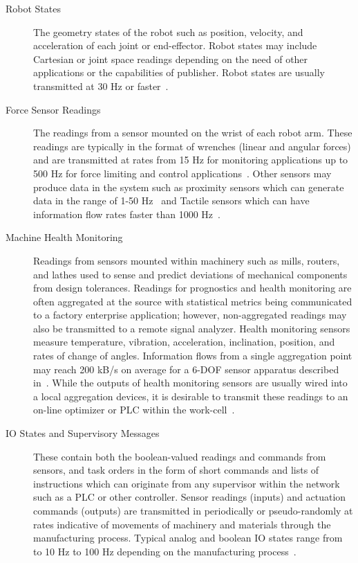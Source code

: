 \documentclass[journal, twoside]{IEEEtran}
\begin{document}
	\begin{description}
		
		\item[Robot States] The geometry states of the robot such as position, velocity, and acceleration of each joint or end-effector. Robot states may include Cartesian or joint space readings depending on the need of other applications or the capabilities of publisher.  Robot states are usually transmitted at 30 Hz or faster~\cite{JMarvel2017}.
		
		\item[Force Sensor Readings] The readings from a sensor mounted on the wrist of each robot arm. These readings are typically in the format of wrenches (linear and angular forces) and are transmitted at rates from 15 Hz for monitoring applications up to 500 Hz for force limiting and control applications~\cite{onrobot}. Other sensors may produce data in the system such as proximity sensors which can generate data in the range of 1-50 Hz~\cite{DiffuseSensorSpecs} and Tactile sensors which can have information flow rates faster than 1000 Hz~\cite{TactileInternet}.
        
        \item[Machine Health Monitoring] Readings from sensors mounted within machinery such as mills, routers, and lathes used to sense and predict deviations of mechanical components from design tolerances. Readings for prognostics and health monitoring are often aggregated at the source with statistical metrics being communicated to a factory enterprise application; however, non-aggregated readings may also be transmitted to a remote signal analyzer.  Health monitoring sensors measure temperature, vibration, acceleration, inclination, position, and rates of change of angles. Information flows from a single aggregation point may reach 200 kB/s on average for a 6-DOF sensor apparatus described in~\cite{ELWeiss}. While the outputs of health monitoring sensors are usually wired into a local aggregation devices, it is desirable to transmit these readings to an on-line optimizer or PLC within the work-cell~\cite{Weiss2016.PHM}.
 
		\item[IO States and Supervisory Messages] These contain both the boolean-valued readings and commands from sensors, and task orders in the form of short commands and lists of instructions which can originate from any supervisor within the network such as a PLC or other controller. Sensor readings (inputs) and actuation commands (outputs) are transmitted in periodically or pseudo-randomly at rates indicative of movements of machinery and materials through the manufacturing process.  Typical analog and boolean IO states range from to 10 Hz to 100 Hz depending on the manufacturing process~\cite{TwinCAT}.
		

\end{description}
\end{document}
